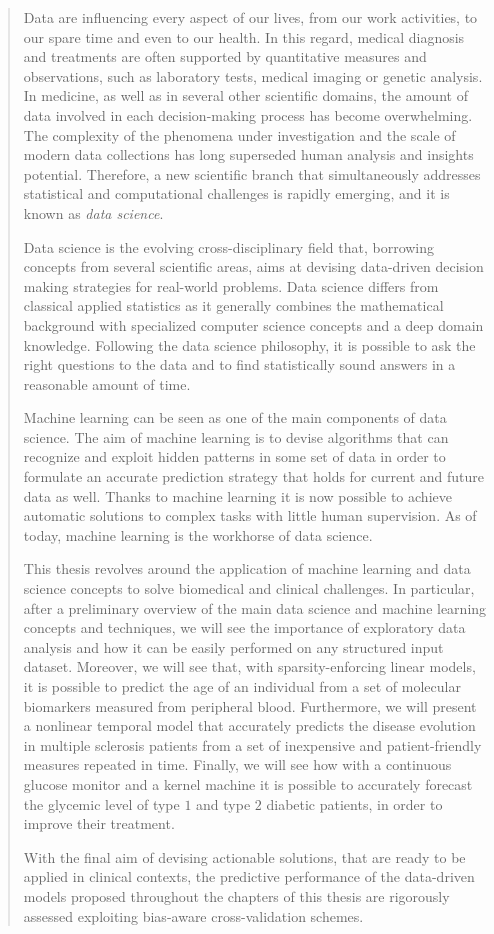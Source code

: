 
\begin{quotation}
\noindent

Data are influencing every aspect of our lives, from our work activities, to our spare time and even to our health.
In this regard, medical diagnosis and treatments are often supported by quantitative measures and observations, such as laboratory tests, medical imaging or genetic analysis.
In medicine, as well as in several other scientific domains, the amount of data involved in each decision-making process has become overwhelming.
The complexity of the phenomena under investigation and the scale of modern data collections has long superseded human analysis and insights potential.
Therefore, a new scientific branch that simultaneously addresses statistical and computational challenges is rapidly emerging, and it is known as \textit{data science}.

Data science is the evolving cross-disciplinary field that, borrowing concepts from several scientific areas, aims at devising data-driven decision making strategies for real-world problems.
Data science differs from classical applied statistics as it generally combines the mathematical background with specialized computer science concepts and a deep domain knowledge.
Following the data science philosophy, it is possible to ask the right questions to the data and to find statistically sound answers in a reasonable amount of time.

Machine learning can be seen as one of the main components of data science. The aim of machine learning is to devise algorithms that can recognize and exploit hidden patterns in some set of data in order to formulate an accurate prediction strategy that holds for current and future data as well. Thanks to machine learning it is now possible to achieve automatic solutions to complex tasks with little human supervision.
As of today, machine learning is the workhorse of data science.

This thesis revolves around the application of machine learning and data science concepts to solve biomedical and clinical challenges. In particular, after a preliminary overview of the main data science and machine learning concepts and techniques, we will see the importance of exploratory data analysis and how it can be easily performed on any structured input dataset. Moreover, we will see that, with sparsity-enforcing linear models, it is possible to predict the age of an individual from a set of molecular biomarkers measured from peripheral blood. Furthermore, we will present a nonlinear temporal model that accurately predicts the disease evolution in multiple sclerosis patients from a set of inexpensive and patient-friendly measures repeated in time. Finally, we will see how with a continuous glucose monitor and a kernel machine it is possible to accurately forecast the glycemic level of type $1$ and type $2$ diabetic patients, in order to improve their treatment.

With the final aim of devising actionable solutions, that are ready to be applied in clinical contexts, the predictive performance of the data-driven models proposed throughout the chapters of this thesis are rigorously assessed exploiting bias-aware cross-validation schemes.




\end{quotation}